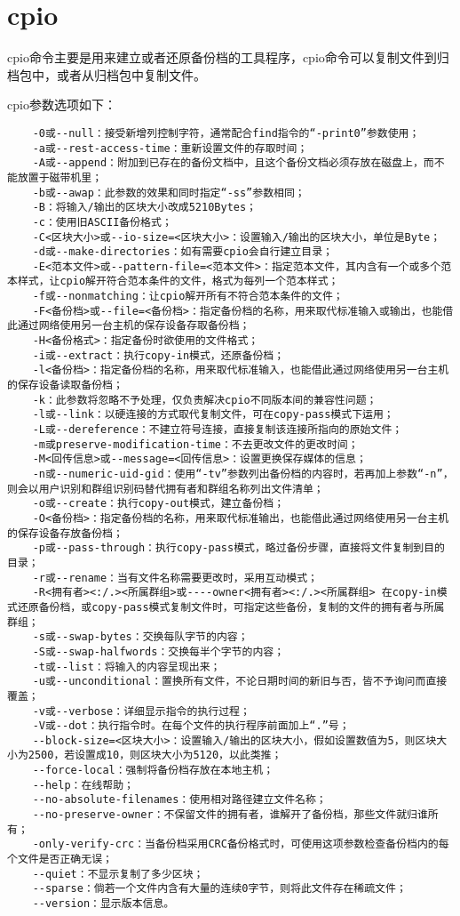 \documentclass[a4paper,left=2.5cm,right=2.5cm,11pt]{article}
\begin{document}
\section{cpio}
	cpio命令主要是用来建立或者还原备份档的工具程序，cpio命令可以复制文件到归档包中，或者从归档包中复制文件。\par

	cpio参数选项如下：
	\begin{lstlisting}
	-0或--null：接受新增列控制字符，通常配合find指令的“-print0”参数使用； 
	-a或--rest-access-time：重新设置文件的存取时间； 
	-A或--append：附加到已存在的备份文档中，且这个备份文档必须存放在磁盘上，而不能放置于磁带机里； 
	-b或--awap：此参数的效果和同时指定“-ss”参数相同； 
	-B：将输入/输出的区块大小改成5210Bytes； 
	-c：使用旧ASCII备份格式； 
	-C<区块大小>或--io-size=<区块大小>：设置输入/输出的区块大小，单位是Byte； 
	-d或--make-directories：如有需要cpio会自行建立目录； 
	-E<范本文件>或--pattern-file=<范本文件>：指定范本文件，其内含有一个或多个范本样式，让cpio解开符合范本条件的文件，格式为每列一个范本样式； 
	-f或--nonmatching：让cpio解开所有不符合范本条件的文件； 
	-F<备份档>或--file=<备份档>：指定备份档的名称，用来取代标准输入或输出，也能借此通过网络使用另一台主机的保存设备存取备份档； 
	-H<备份格式>：指定备份时欲使用的文件格式； 
	-i或--extract：执行copy-in模式，还原备份档； 
	-l<备份档>：指定备份档的名称，用来取代标准输入，也能借此通过网络使用另一台主机的保存设备读取备份档； 
	-k：此参数将忽略不予处理，仅负责解决cpio不同版本间的兼容性问题； 
	-l或--link：以硬连接的方式取代复制文件，可在copy-pass模式下运用； 
	-L或--dereference：不建立符号连接，直接复制该连接所指向的原始文件； 
	-m或preserve-modification-time：不去更改文件的更改时间； 
	-M<回传信息>或--message=<回传信息>：设置更换保存媒体的信息； 
	-n或--numeric-uid-gid：使用“-tv”参数列出备份档的内容时，若再加上参数“-n”，则会以用户识别和群组识别码替代拥有者和群组名称列出文件清单； 
	-o或--create：执行copy-out模式，建立备份档； 
	-O<备份档>：指定备份档的名称，用来取代标准输出，也能借此通过网络使用另一台主机的保存设备存放备份档； 
	-p或--pass-through：执行copy-pass模式，略过备份步骤，直接将文件复制到目的目录； 
	-r或--rename：当有文件名称需要更改时，采用互动模式； 
	-R<拥有者><:/.><所属群组>或----owner<拥有者><:/.><所属群组> 在copy-in模式还原备份档，或copy-pass模式复制文件时，可指定这些备份，复制的文件的拥有者与所属群组； 
	-s或--swap-bytes：交换每队字节的内容； 
	-S或--swap-halfwords：交换每半个字节的内容； 
	-t或--list：将输入的内容呈现出来； 
	-u或--unconditional：置换所有文件，不论日期时间的新旧与否，皆不予询问而直接覆盖； 
	-v或--verbose：详细显示指令的执行过程； 
	-V或--dot：执行指令时。在每个文件的执行程序前面加上“.”号； 
	--block-size=<区块大小>：设置输入/输出的区块大小，假如设置数值为5，则区块大小为2500，若设置成10，则区块大小为5120，以此类推； 
	--force-local：强制将备份档存放在本地主机； 
	--help：在线帮助； 
	--no-absolute-filenames：使用相对路径建立文件名称； 
	--no-preserve-owner：不保留文件的拥有者，谁解开了备份档，那些文件就归谁所有； 
	-only-verify-crc：当备份档采用CRC备份格式时，可使用这项参数检查备份档内的每个文件是否正确无误； 
	--quiet：不显示复制了多少区块； 
	--sparse：倘若一个文件内含有大量的连续0字节，则将此文件存在稀疏文件； 
	--version：显示版本信息。
	\end{lstlisting}
\end{document}
